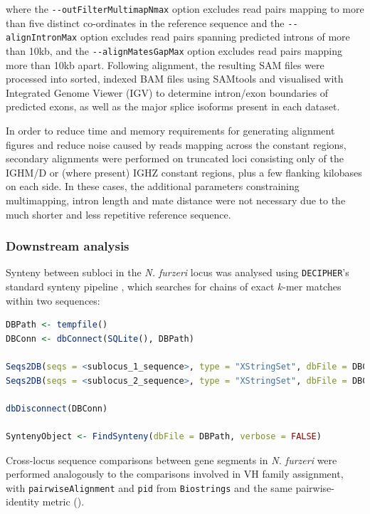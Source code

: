 where the \lstinline{--outFilterMultimapNmax} option excludes read pairs mapping to more than five distinct co-ordinates in the reference sequence and the \lstinline{--alignIntronMax} option excludes read pairs spanning predicted introns of more than 10kb, and the \lstinline{--alignMatesGapMax} option excludes read pairs mapping more than 10kb apart. Following alignment, the resulting SAM files were processed into sorted, indexed BAM files using SAMtools and visualised with Integrated Genome Viewer (IGV) to determine intron/exon boundaries of predicted exons, as well as the major splice isoforms present in each dataset.

In order to reduce time and memory requirements for generating alignment figures and reduce noise caused by reads mapping  across the constant regions, secondary alignments were performed on truncated loci consisting only of the IGHM/D or (where present) IGHZ constant regions, plus a few flanking kilobases on each side. In these cases, the additional parameters constraining multimapping, intron length and mate distance were not necessary due to the much shorter and less repetitive reference sequence.

\subsubsection{Downstream analysis}


Synteny between subloci in the \textit{N. furzeri} locus was analysed using \lstinline[language=R]{DECIPHER}'s standard synteny pipeline \citep{wright2016decipher}, which searches for chains of exact $k$-mer matches within two sequences:

\begin{lstlisting}[language=R]
DBPath <- tempfile()
DBConn <- dbConnect(SQLite(), DBPath)

Seqs2DB(seqs = <sublocus_1_sequence>, type = "XStringSet", dbFile = DBConn, identifier = "IGH1", verbose = FALSE)
Seqs2DB(seqs = <sublocus_2_sequence>, type = "XStringSet", dbFile = DBConn, identifier = "IGH2", verbose = FALSE)

dbDisconnect(DBConn)

SyntenyObject <- FindSynteny(dbFile = DBPath, verbose = FALSE)
\end{lstlisting}

Cross-locus sequence comparisons between gene segments in \textit{N. furzeri} were performed analogously to the comparisons involved in VH family assignment, with \lstinline[language=R]{pairwiseAlignment} and \lstinline[language=R]{pid} from \lstinline[language=R]{Biostrings} and the same pairwise-identity metric ().

